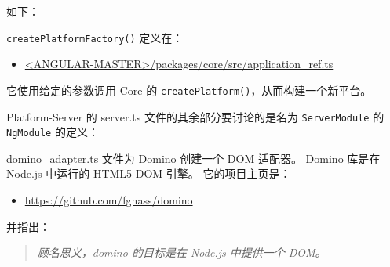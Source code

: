
如下：




\texttt{createPlatformFactory()} 定义在：

\begin{itemize}
  \item \href{https://github.com/angular/angular/blob/master/packages/core/src/application_ref.ts}
        {<ANGULAR-MASTER>/packages/core/src/application\_ref.ts}
\end{itemize}


它使用给定的参数调用 Core 的 \texttt{createPlatform()}，从而构建一个新平台。


Platform-Server 的 server.ts 文件的其余部分要讨论的是名为
\texttt{ServerModule} 的 \texttt{NgModule} 的定义：




domino\_adapter.ts 文件为 Domino 创建一个 DOM 适配器。
Domino 库是在 Node.js 中运行的 HTML5 DOM 引擎。
它的项目主页是：

\begin{itemize}
  \item \url{https://github.com/fgnass/domino}
\end{itemize}


并指出：

\begin{quote}
  \emph{顾名思义，domino 的目标是在 Node.js 中提供一个 DOM。}
\end{quote}



